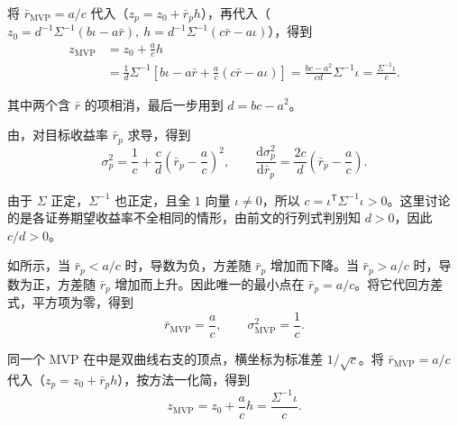 \begin{solution}[label-content={方法一（沿前沿对展开的二次型求导）},blank-type=none]
将 $\bar r_{\mathrm{MVP}}=a/c$ 代入（$z_p=z_0+\bar r_p h$），再代入（$z_0=d^{-1}\Sigma^{-1}(b\iota-a\bar r),\ h=d^{-1}\Sigma^{-1}(c\bar r-a\iota)$），得到
\[
 \begin{aligned}
 z_{\mathrm{MVP}}
 &=z_0+\frac ac h\\
 &=\frac1d\Sigma^{-1}\left[b\iota-a\bar r+\frac ac(c\bar r-a\iota)\right]=\frac{bc-a^2}{cd}\Sigma^{-1}\iota
 =\frac{\Sigma^{-1}\iota}{c}.
 \end{aligned}
\]

其中两个含 $\bar r$ 的项相消，最后一步用到 $d=bc-a^2$。
\end{solution}

\begin{solution}[label-content={方法二（沿前沿对配方后的方差式求导）},blank-type=none]
由，对目标收益率 $\bar r_p$ 求导，得到
\[
 \sigma_p^2=\frac1c+\frac cd\left(\bar r_p-\frac ac\right)^2,
 \qquad
 \frac{\mathrm d\sigma_p^2}{\mathrm d\bar r_p}
 =\frac{2c}{d}\left(\bar r_p-\frac ac\right).
\]

由于 $\Sigma$ 正定，$\Sigma^{-1}$ 也正定，且全 $1$ 向量 $\iota\ne0$，所以 $c=\iota^{\mathsf T}\Sigma^{-1}\iota>0$。这里讨论的是各证券期望收益率不全相同的情形，由前文的行列式判别知 $d>0$，因此 $c/d>0$。

如所示，当 $\bar r_p<a/c$ 时，导数为负，方差随 $\bar r_p$ 增加而下降。当 $\bar r_p>a/c$ 时，导数为正，方差随 $\bar r_p$ 增加而上升。因此唯一的最小点在 $\bar r_p=a/c$。将它代回方差式，平方项为零，得到
\[
 \bar r_{\mathrm{MVP}}=\frac ac,
 \qquad
 \sigma_{\mathrm{MVP}}^2=\frac1c.
\]

\begin{center}
\begin{minipage}{\linewidth}
\centering
\renewcommand{\thewjFigure}{\thechapter.S\arabic{wjFigure}}%
%
\par
{}
\end{minipage}
\end{center}

同一个 MVP 在中是双曲线右支的顶点，横坐标为标准差 $1/\sqrt c$。将 $\bar r_{\mathrm{MVP}}=a/c$ 代入（$z_p=z_0+\bar r_p h$），按方法一化简，得到
\[
 z_{\mathrm{MVP}}=z_0+\frac ac h=\frac{\Sigma^{-1}\iota}{c}.
\]


\end{solution}
